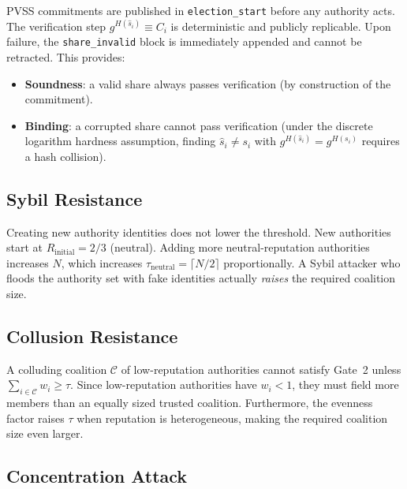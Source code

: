 \documentclass[12pt,a4paper]{article}
\theoremstyle{definition}
\theoremstyle{remark}
\begin{document}
PVSS commitments are published in \texttt{election\_start} before any
authority acts. The verification step $g^{H(\hat{s}_i)} \equiv C_i$
is deterministic and publicly replicable. Upon failure, the
\texttt{share\_invalid} block is immediately appended and cannot be
retracted. This provides:
\begin{itemize}
  \item \textbf{Soundness}: a valid share always passes verification
    (by construction of the commitment).
  \item \textbf{Binding}: a corrupted share cannot pass verification
    (under the discrete logarithm hardness assumption, finding
    $\hat{s}_i \neq s_i$ with $g^{H(\hat{s}_i)} = g^{H(s_i)}$ requires
    a hash collision).
\end{itemize}

\subsection{Sybil Resistance}

Creating new authority identities does not lower the threshold.
New authorities start at $R_{\text{initial}} = 2/3$ (neutral).
Adding more neutral-reputation authorities increases $N$, which increases
$\tau_{\text{neutral}} = \lceil N/2 \rceil$ proportionally.
A Sybil attacker who floods the authority set with fake identities
actually \emph{raises} the required coalition size.

\subsection{Collusion Resistance}

A colluding coalition $\mathcal{C}$ of low-reputation authorities cannot
satisfy Gate~2 unless $\sum_{i \in \mathcal{C}} w_i \geq \tau$.
Since low-reputation authorities have $w_i < 1$, they must field more
members than an equally sized trusted coalition.
Furthermore, the evenness factor raises $\tau$ when reputation is
heterogeneous, making the required coalition size even larger.

\subsection{Concentration Attack}
\end{document}
